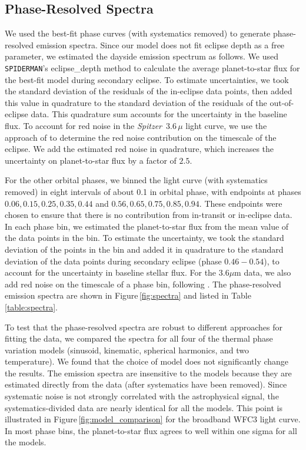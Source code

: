 \documentclass[twocolumn]{aastex61}
\newcommand{\project}[1]{\textsl{#1}}
\newcommand{\Spitzer}{\project{Spitzer}}
\begin{document}
\subsection{Phase-Resolved Spectra}
We used the best-fit phase curves (with systematics removed) to generate phase-resolved emission spectra.  Since our model does not fit eclipse depth as a free parameter, we estimated the dayside emission spectrum as follows. We used \texttt{SPIDERMAN}'s eclipse\_depth method to calculate the average planet-to-star flux for the best-fit model during secondary eclipse.  To estimate uncertainties, we took the standard deviation of the residuals of the in-eclipse data points, then added this value in quadrature to the standard deviation of the residuals of the out-of-eclipse data.  This quadrature sum accounts for the uncertainty in the baseline flux. To account for red noise in the \Spitzer\ $3.6\,\mu$ light curve, we use the approach of \cite{pont06} to determine the red noise contribution on the timescale of the eclipse. We add the estimated red noise in quadrature, which increases the uncertainty on planet-to-star flux by a factor of $2.5$.

For the other orbital phases, we binned the light curve (with systematics removed) in eight intervals of about 0.1 in orbital phase, with endpoints at phases $0.06, 0.15, 0.25, 0.35, 0.44$ and $0.56, 0.65, 0.75, 0.85, 0.94$. These endpoints were chosen to ensure that there is no contribution from in-transit or in-eclipse data.  In each phase bin, we estimated the planet-to-star flux from the mean value of the data points in the bin. To estimate the uncertainty, we took the standard deviation of the points in the bin and added it in quadrature to the standard deviation of the data points during secondary eclipse (phase $0.46-0.54$), to account for the uncertainty in baseline stellar flux.  For the $3.6\mu$m data, we also add red noise on the timescale of a phase bin, following \cite{pont06}.  The phase-resolved emission spectra are shown in Figure\,\ref{fig:spectra} and listed in Table\,\ref{table:spectra}. 

To test that the phase-resolved spectra are robust to different approaches for fitting the data, we compared the spectra for all four of the thermal phase variation models (sinusoid, kinematic, spherical harmonics, and two temperature). We found that the choice of model does not significantly change the results.  The emission spectra are insensitive to the models because they are estimated directly from the data (after systematics have been removed). Since systematic noise is not strongly correlated with the astrophysical signal, the systematics-divided data are nearly identical for all the models.  This point is illustrated in Figure\,\ref{fig:model_comparison} for the broadband WFC3 light curve. In most phase bins, the planet-to-star flux agrees to well within one sigma for all the models. 
\end{document}
